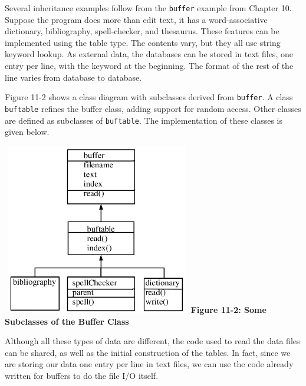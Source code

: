 Several inheritance examples follow from the \texttt{buffer}
example from Chapter 10. Suppose the program does more than
edit text, it has a word-associative
dictionary, bibliography, spell-checker, and thesaurus. These
features can be implemented using the table type.
The contents vary, but they all use string
keyword lookup. As external data, the databases can be stored in text
files, one entry per line, with the keyword at the beginning. The
format of the rest of the line varies from database to database.

Figure 11-2 shows a class diagram with subclasses derived from
\texttt{buffer}. A class \texttt{buftable} refines the
buffer class, adding support for random access. Other classes are
defined as subclasses of \texttt{buftable}. The implementation of these
classes is given below.


\begin{center}
\includegraphics[width=3.24in,height=2.95in]{ub-img/ub-img43.png}
\linebreak
{\sffamily\bfseries Figure 11-2: Some Subclasses of the Buffer Class}
\end{center}

\bigskip

Although all these types of data are different, the code used to read
the data files can be shared, as well as the initial construction of
the tables. In fact, since we are storing our data one entry per line
in text files, we can use the code already written for buffers to do
the file I/O itself. 


